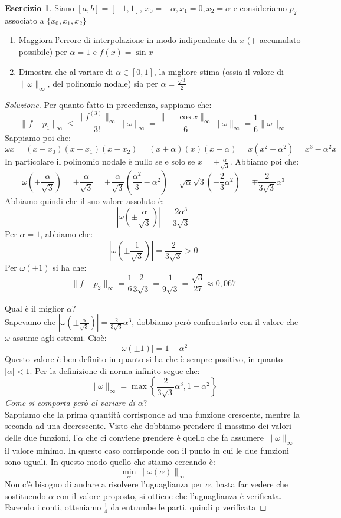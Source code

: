 \documentclass[11pt,a4paper,twoside]{article}
\theoremstyle{definition}
\newtheorem*{ese}{Esercizio}
\newenvironment{sol}
	{\renewcommand\qedsymbol{$\blacksquare$}\begin{proof}[Soluzione]}
	{\end{proof}}
\begin{document}
\begin{ese}
	Siano $[a,b] = [-1,1]$, $x_0 = -\alpha, x_1 = 0, x_2 = \alpha$ e consideriamo $p_2$ associato a $\{x_0, x_1, x_2\}$
	\begin{enumerate}
		\item Maggiora l'errore di interpolazione in modo indipendente da $x$ (+ accumulato possibile) per $\alpha = 1$ e $f(x) = \sin x$
		\item Dimostra che al variare di $\alpha \in [0,1]$, la migliore stima (ossia il valore di $\|\omega\|_\infty$, del polinomio nodale) sia per $\alpha = \frac {\sqrt 3} 2$
	\end{enumerate}
\end{ese}

\begin{sol}
	 Per quanto fatto in precedenza, sappiamo che:
	\[ \|f-p_1\|_\infty \leq \frac{\|f^{(3)}\|_\infty}{3!} \|\omega\|_\infty = \frac{\|-\cos x\|_\infty}{6}\|\omega\|_\infty = \frac 16 \|\omega\|_\infty \]
	Sappiamo poi che:
	\[\omega x = (x-x_0)(x-x_1)(x-x_2) = (x+\alpha)(x)(x-\alpha) = x(x^2-\alpha^2) = x^3 - \alpha^2 x\]
	In particolare il polinomio nodale è nullo se e solo se $x = \pm \frac \alpha{\sqrt 3}$. Abbiamo poi che:
	\[ \omega\left( \pm \frac \alpha {\sqrt 3} \right) = \pm \frac{\alpha}{\sqrt 3} = \pm \frac \alpha{\sqrt 3} \left( \frac{\alpha^2}3 - \alpha^2 \right) =\sqrt \alpha {\sqrt 3}\left( -\frac 23 \alpha^2 \right) = \mp \frac 2{3 \sqrt 3}\alpha^3 \]
	Abbiamo quindi che il suo valore assoluto è:
	\[ \left| \omega \left( \pm \frac \alpha {\sqrt 3} \right) \right| = \frac{2 \alpha^3}{3 \sqrt 3}\]
	Per $\alpha = 1$, abbiamo che:
	\[ \left| \omega\left( \pm \frac 1{\sqrt 3} \right) \right| = \frac 2{3 \sqrt 3}>0 \]
	Per $\omega(\pm 1)$ si ha che:
	\[ \|f- p_2\|_\infty = \frac 16 \frac{2}{3 \sqrt 3} = \frac 1{9\sqrt 3} = \frac {\sqrt 3}{27} \approx 0,067 \]

	 Qual è il miglior $\alpha$?\\
	Sapevamo che $|\omega(\pm\frac \alpha{\sqrt 3})| = \frac 2{3 \sqrt 3}\alpha^3$, dobbiamo però confrontarlo con il valore che $\omega$ assume agli estremi. Cioè:
	\[ |\omega(\pm 1)| = 1 - \alpha^2 \]
	Questo valore è ben definito in quanto si ha che è sempre positivo, in quanto $|\alpha|<1$. Per la definizione di norma infinito segue che:
	\[ \|\omega\|_\infty = \max\left\{ \frac 2{3 \sqrt 3}\alpha^3, 1 - \alpha^2 \right\} \]
	\textit{Come si comporta però al variare di $\alpha?$}\\
	Sappiamo che la prima quantità corrisponde ad una funzione crescente, mentre la seconda ad una decrescente. Visto che dobbiamo prendere il massimo dei valori delle due funzioni, l'$\alpha$ che ci conviene prendere è quello che fa assumere $\|\omega\|_\infty$ il valore minimo. In questo caso corrisponde con il punto in cui le due funzioni sono uguali. In questo modo quello che stiamo cercando è:
	\[ \min_{\alpha} \|\omega(\alpha)\|_\infty \]
	Non c'è bisogno di andare a risolvere l'uguaglianza per $\alpha$, basta far vedere che sostituendo $\alpha$ con il valore proposto, si ottiene che l'uguaglianza è verificata. Facendo i conti, otteniamo $\frac 14$ da entrambe le parti, quindi p verificata
\end{sol}
\end{document}
